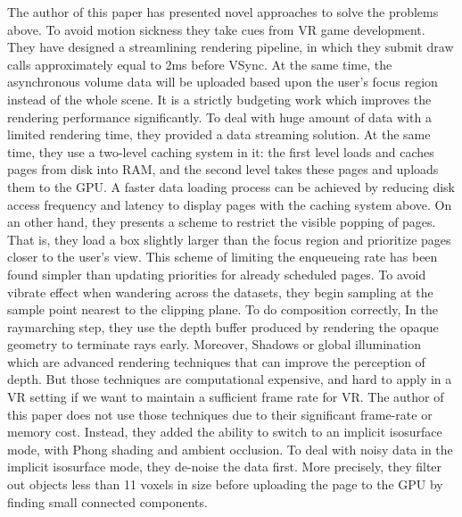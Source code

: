 \documentclass[10pt,twocolumn,letterpaper]{article}
\begin{document}
The author of this paper has presented novel approaches to solve the problems above. To avoid motion sickness they take cues from VR game development. They have designed a streamlining rendering pipeline, in which they submit draw calls approximately equal to 2ms before VSync. At the same time, the asynchronous volume data will be uploaded based upon the user’s focus region instead of the whole scene. It is a strictly budgeting work which improves the rendering performance significantly. To deal with huge amount of data with a limited rendering time, they provided a data streaming solution. At the same time, they use a two-level caching system in it: the first level loads and caches pages from disk into RAM, and the second level takes these pages and uploads them to the GPU. A faster data loading process can be achieved by reducing disk access frequency and latency to display pages with the caching system above. On an other hand, they presents a scheme to restrict the visible popping of pages. That is, they load a box slightly larger than the focus region and prioritize pages closer to the user’s view. This scheme of limiting the enqueueing rate has been found simpler than updating priorities for already scheduled pages. To avoid vibrate effect when wandering across the datasets, they begin sampling at the sample point nearest to the clipping plane. To do composition correctly, In the raymarching step, they use the depth buffer produced by rendering the opaque geometry to terminate rays early. Moreover, Shadows or global illumination which are advanced rendering techniques that can improve the perception of depth. But those techniques are computational expensive, and hard to apply in a VR setting if we want to maintain a sufficient frame rate for VR. The author of this paper does not use those techniques due to their significant frame-rate or memory cost. Instead, they added the ability to switch to an implicit isosurface mode, with Phong shading and ambient occlusion. To deal with noisy data in the implicit isosurface mode, they de-noise the data first. More precisely, they filter out objects less than 11 voxels in size before uploading the page to the GPU by finding small connected components.
\end{document}
